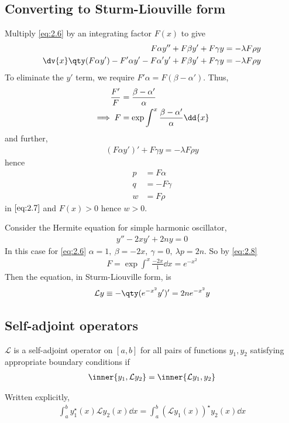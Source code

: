 \subsection{Converting to Sturm-Liouville form}
Multiply \cref{eq:2.6} by an integrating factor $F(x)$ to give
\begin{align*}
    F \alpha y'' + F \beta y' + F \gamma y &= -\lambda F \rho y \\
    \dv{x} \qty(F \alpha y') - F' \alpha y' - F \alpha' y' + F \beta y' + F \gamma y &= -\lambda F \rho y
\end{align*}
To eliminate the $y'$ term, we require $F'\alpha = F(\beta - \alpha')$.
Thus,
\begin{align}
    \frac{F'}{F} &= \frac{\beta - \alpha'}{\alpha} \notag \\
    \implies F &= \exp \int^x \frac{\beta - \alpha'}{\alpha} \dd{x} \label{eq:2.8}
\end{align}
and further,
\begin{align*}
    (F\alpha y')' + F \gamma y = - \lambda F \rho y
\end{align*}
hence
\begin{align*}
    p & = F \alpha \\
    q & = -F \gamma \\
    w & = F \rho
\end{align*} in $\cref{eq:2.7}$ and $F(x) > 0$ hence $w > 0$.
\begin{example}
    Consider the Hermite equation for simple harmonic oscillator,
    \begin{align*}
        y'' - 2xy' + 2ny = 0
    \end{align*}
    In this case for \cref{eq:2.6} $\alpha = 1,\ \beta = -2x,\ \gamma = 0,\ \lambda p = 2n$.
    So by \cref{eq:2.8}
    \begin{align*}
        F = \exp \int^x \frac{-2x}{1} \dd{x} = e^{-x^2}
    \end{align*}
    Then the equation, in Sturm-Liouville form, is
    \begin{align}
        \mathcal L y \equiv -\qty(e^{-x^2} y')' = 2n e^{-x^2} y \label{eq:2.9}
    \end{align}
\end{example}

\subsection{Self-adjoint operators}
\begin{definition}
    $\mathcal L$ is a self-adjoint operator on $[a,b]$ for all pairs of functions $y_1,y_2$ satisfying appropriate boundary conditions if
    \begin{align*}
        \inner{y_1, \mathcal L y_2} = \inner{\mathcal L y_1, y_2}
    \end{align*}
\end{definition}
Written explicitly,
\begin{align} \label{eq:2.10}
    \int_a^b y_1^\star(x) \mathcal L y_2(x) \dd{x} = \int_a^b (\mathcal L y_1(x))^\star y_2(x) \dd{x}
\end{align}

